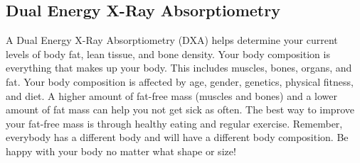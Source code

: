 \subsection{Dual Energy X-Ray Absorptiometry}

A Dual Energy X-Ray Absorptiometry (DXA) helps determine your current levels of body fat, lean tissue, and bone density. Your body composition is everything that makes up your body. This includes muscles, bones, organs, and fat. Your body composition is affected by age, gender, genetics, physical fitness, and diet. A higher amount of fat-free mass (muscles and bones) and a lower amount of fat mass can help you not get sick as often. The best way to improve your fat-free mass is through healthy eating and regular exercise. Remember, everybody has a different body and will have a different body composition. Be happy with your body no matter what shape or size!